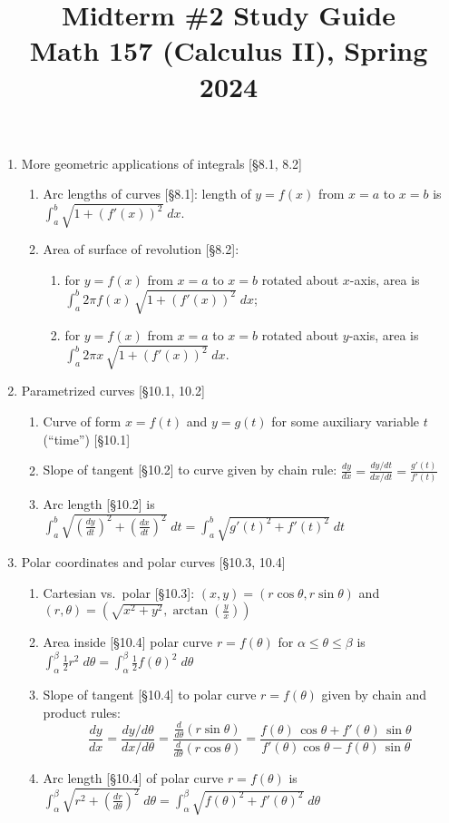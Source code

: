\documentclass[11pt]{article}
\title{Midterm \#2 Study Guide \\ Math 157 (Calculus II), Spring 2024}
\date{}
\begin{document}
\maketitle

\thispagestyle{empty}

\vspace{-2cm}

\begin{enumerate}
\item More geometric applications of integrals [\S8.1, 8.2]
\begin{enumerate}
\item Arc lengths of curves [\S8.1]: length of $y=f(x)$ from $x=a$ to $x=b$ is $\int_{a}^{b} \sqrt{1+(f'(x))^2} \; dx$.
\item Area of surface of revolution [\S8.2]: 
\begin{enumerate}
\item for $y=f(x)$ from $x=a$ to $x=b$ rotated about $x$-axis, area is $\int_{a}^{b} 2\pi f(x) \, \sqrt{1+(f'(x))^2} \; dx$;
\item for $y=f(x)$ from $x=a$ to $x=b$ rotated about $y$-axis, area is $\int_{a}^{b} 2\pi x \, \sqrt{1+(f'(x))^2} \; dx$.
\end{enumerate}
\end{enumerate}

\item Parametrized curves [\S10.1, 10.2]
\begin{enumerate}
\item Curve of form $x=f(t)$ and $y=g(t)$ for some auxiliary variable $t$ (``time'') [\S10.1]
\item Slope of tangent [\S10.2] to curve given by chain rule: $\frac{dy}{dx} = \frac{dy/dt}{dx/dt} = \frac{g'(t)}{f'(t)}$ 
\item Arc length [\S10.2] is $\int_{a}^{b} \sqrt{(\frac{dy}{dt})^2 + (\frac{dx}{dt})^2} \; dt = \int_{a}^{b} \sqrt{g'(t)^2 + f'(t)^2} \; dt$
\end{enumerate}

\item Polar coordinates and polar curves [\S10.3, 10.4]
\begin{enumerate}
\item Cartesian vs.~polar [\S10.3]: $(x,y) = (r\cos \theta, r \sin \theta)$ and $(r,\theta) = (\sqrt{x^2+y^2}, \arctan (\frac{y}{x}))$
\item Area inside [\S10.4] polar curve $r=f(\theta)$ for $\alpha \leq \theta \leq \beta$ is $\int_{\alpha}^{\beta} \frac{1}{2} r^2 \; d\theta=\int_{\alpha}^{\beta} \frac{1}{2} f(\theta)^2 \; d\theta$ 
\item Slope of tangent [\S10.4] to polar curve $r=f(\theta)$ given by chain and product rules: 
{\small \[\frac{dy}{dx} = \frac{dy/d\theta}{dx/d\theta} = \frac{\frac{d}{d\theta}(r \sin\theta)}{\frac{d}{d\theta}(r \cos\theta)} = \frac{f(\theta)\, \cos \theta  + f'(\theta) \, \sin \theta}{f'(\theta)\cos\theta-f(\theta)\, \sin\theta }\]}
\item Arc length [\S10.4] of polar curve $r=f(\theta)$ is $\int_{\alpha}^{\beta} \sqrt{r^2 + (\frac{dr}{d\theta})^2} \; d\theta = \int_{\alpha}^{\beta} \sqrt{f(\theta)^2 + f'(\theta)^2} \; d\theta$ 
\end{enumerate}

\end{enumerate}
\end{document}
